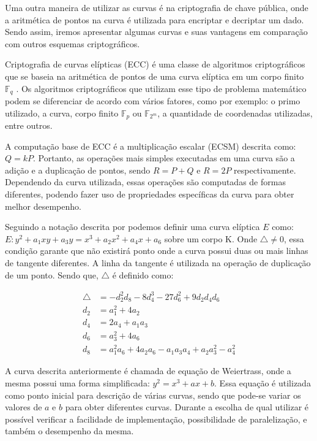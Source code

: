 Uma outra maneira de utilizar as curvas é na criptografia de chave pública, onde a aritmética de pontos na curva é utilizada para encriptar e decriptar um dado. Sendo assim, iremos apresentar algumas curvas e suas vantagens em comparação com outros esquemas criptográficos.

Criptografia de curvas elípticas (ECC) é uma classe de algoritmos criptográficos que se baseia na aritmética de pontos de uma curva elíptica em um corpo finito $\mathbb{F}_q$ \cite{Hankerson:2003:GEC:940321}. Os algoritmos criptográficos que utilizam esse tipo de problema matemático podem se diferenciar de acordo com vários fatores, como por exemplo: o primo utilizado, a curva, corpo finito $\mathbb{F}_p$ ou $\mathbb{F}_{2^m}$, a quantidade de coordenadas utilizadas, entre outros.

A computação base de ECC é a multiplicação escalar (ECSM) descrita como: $Q = kP$. Portanto, as operações mais simples executadas em uma curva são a adição e a duplicação de pontos, sendo $R = P + Q$ e $R = 2P$ respectivamente. Dependendo da curva utilizada, essas operações são computadas de formas diferentes, podendo fazer uso de propriedades específicas da curva para obter melhor desempenho.

Seguindo a notação descrita por \cite{Hankerson:2003:GEC:940321} podemos definir uma curva elíptica $E$ como: $E: y^2 + a_1xy + a_3y = x^3 + a_2x^2 + a_4x + a_6$ sobre um corpo K. Onde $\bigtriangleup \neq 0$, essa condição garante que não existirá ponto onde a curva possui duas ou mais linhas de tangente diferentes. A linha da tangente é utilizada na operação de duplicação de um ponto. Sendo que, $\bigtriangleup$ é definido como:

\begin{align*}
\bigtriangleup &= -d_2^2d_8 - 8d_4^3 - 27d_6^2 + 9d_2d_4d_6 \\
d_2 &= a_1^2 + 4a_2 \\
d_4 &= 2a_4 + a_1a_3 \\ 
d_6 &= a_3^2 + 4a_6 \\
d_8 &= a_1^2a_6 + 4a_2a_6 - a_1a_3a_4 + a_2a_3^2 - a_4^2
\end{align*}

A curva descrita anteriormente é chamada de equação de Weiertrass, onde a mesma possui uma forma simplificada: $y^2 = x^3 + ax + b$. Essa equação é utilizada como ponto inicial para descrição de várias curvas, sendo que pode-se variar os valores de $a$ e $b$ para obter diferentes curvas. Durante a escolha de qual utilizar é possível verificar a facilidade de implementação, possibilidade de paralelização, e também o desempenho da mesma. 

